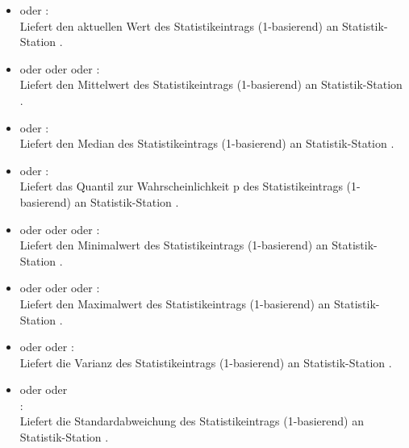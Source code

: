 \begin{itemize}

\item
{} oder :\\
Liefert den aktuellen Wert des Statistikeintrags  (1-basierend) an Statistik-Station .

\item
{} oder  oder  oder :\\
Liefert den Mittelwert des Statistikeintrags  (1-basierend) an Statistik-Station .

\item
{} oder :\\
Liefert den Median des Statistikeintrags  (1-basierend) an Statistik-Station .

\item
{} oder :\\
Liefert das Quantil zur Wahrscheinlichkeit p des Statistikeintrags  (1-basierend) an Statistik-Station .

\item
{} oder  oder  oder :\\
Liefert den Minimalwert des Statistikeintrags  (1-basierend) an Statistik-Station .

\item
{} oder  oder  oder :\\
Liefert den Maximalwert des Statistikeintrags  (1-basierend) an Statistik-Station .

\item
{} oder  oder :\\
Liefert die Varianz des Statistikeintrags  (1-basierend) an Statistik-Station .

\item
{} oder  oder\\
:\\
Liefert die Standardabweichung des Statistikeintrags  (1-basierend) an Statistik-Station .


\end{itemize}
